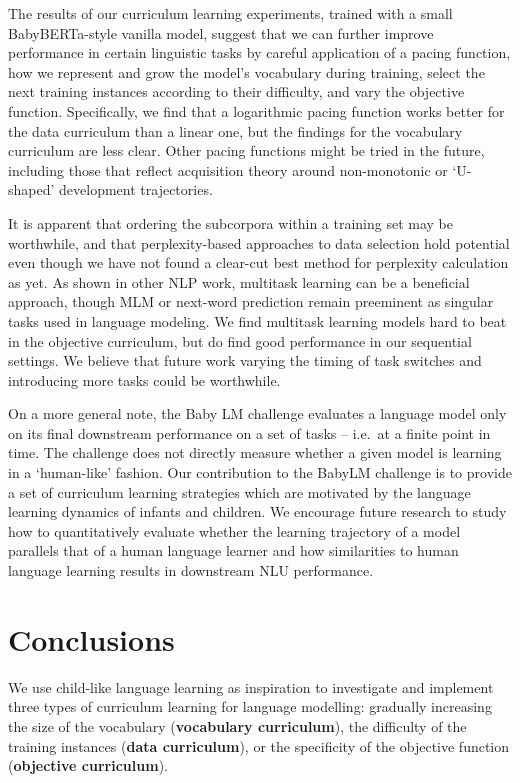 The results of our curriculum learning experiments, trained with a small BabyBERTa-style vanilla model, suggest that we can further improve performance in certain linguistic tasks by careful application of a pacing function, how we represent and grow the model's vocabulary during training, select the next training instances according to their difficulty, and vary the objective function. Specifically, we find that a logarithmic pacing function works better for the data curriculum than a linear one, but the findings for the vocabulary curriculum are less clear. Other pacing functions might be tried in the future, including those that reflect acquisition theory around non-monotonic or `U-shaped' development trajectories.

It is apparent that ordering the subcorpora within a training set may be worthwhile, and that perplexity-based approaches to data selection hold potential even though we have not found a clear-cut best method for perplexity calculation as yet. As shown in other NLP work, multitask learning can be a beneficial approach, though MLM or next-word prediction remain preeminent as singular tasks used in language modeling. We find multitask learning models hard to beat in the objective curriculum, but do find good performance in our sequential settings. We believe that future work varying the timing of task switches and introducing more tasks could be worthwhile.

On a more general note, the Baby LM challenge evaluates a language model only on its final downstream performance on a set of tasks -- i.e.\ at a finite point in time. The challenge does not directly measure whether a given model is learning in a `human-like' fashion. Our contribution to the BabyLM challenge is to provide a set of curriculum learning strategies which are motivated by the language learning dynamics of infants and children. We encourage future research to study how to quantitatively evaluate whether the learning trajectory of a model parallels that of a human language learner and how similarities to human language learning results in downstream NLU performance. 

\section{Conclusions}
We use child-like language learning as inspiration to investigate and implement three types of curriculum learning for language modelling: gradually increasing the size of the vocabulary (\textbf{vocabulary curriculum}), the difficulty of the training instances (\textbf{data curriculum}), or the specificity of the objective function (\textbf{objective curriculum}).

